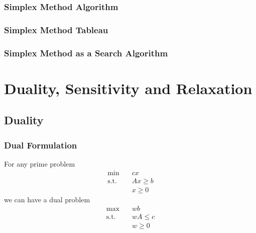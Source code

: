 			\subsection{Simplex Method Algorithm}

			\subsection{Simplex Method Tableau}

			\subsection{Simplex Method as a Search Algorithm}

	\chapter{Duality, Sensitivity and Relaxation}
		\section{Duality}
			\subsection{Dual Formulation}
				For any prime problem
				\begin{align}
					\text{min} \quad & cx \\
					\text{s.t.} \quad & Ax\ge b \\
								& x\ge 0 
				\end{align}
				we can have a dual problem
				\begin{align}
					\text{max} \quad & wb  \\
					\text{s.t.} \quad & wA\le c\\
								& w \ge 0
				\end{align}
				
